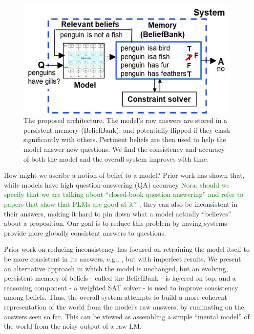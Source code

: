 \documentclass[11pt]{article}
\newcommand{\nk}[1]{\textcolor{green}{Nora: #1}}
\begin{document}
\begin{figure}[t]
\centering
     \includegraphics[width=1\columnwidth]{architecture2.png}	   %
\caption{The proposed architecture. The model's raw answers are stored in a
persistent memory (BeliefBank), and potentially flipped if they clash
significantly with others. Pertinent beliefs are then used to help the model answer new
questions. We find the consistency and accuracy of both the model and the overall
system improves with time. \label{architecture}}
\end{figure}

How might we ascribe a notion of belief to a model? Prior work has shown that, while
models have high question-answering (QA) accuracy \nk{should we specify that we are talking about “closed-book question answering” and refer to papers that show that PLMs are good at it? }, they can also be inconsistent in their
answers, making it hard to pin down what a model actually ``believes'' about a proposition.
Our goal is to reduce this problem by having systems provide more globally consistent
answers to questions.

Prior work on reducing inconsistency has focused on retraining the model itself to be
more consistent in its answers, e.g., \cite{Ribeiro2019AreRR,Li2019ALF}, but with imperfect results. We present an
alternative approach in which the model is unchanged, but an evolving, persistent memory
of beliefs - called the BeliefBank - is layered on top, and a reasoning component - a
weighted SAT solver - is used to improve consistency among beliefs. 
Thus, the overall system attempts to build a more coherent representation of the
world from the model's raw answers, by ruminating on the answers seen so far.
This can be viewed as assembling a simple ``mental model'' of the world from
the noisy output of a raw LM. 
\end{document}
